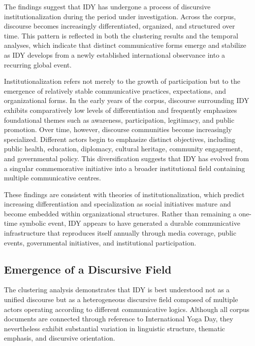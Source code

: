 \documentclass[11pt]{article}
\begin{document}
The findings suggest that IDY has undergone a process of discursive institutionalization during the period under
investigation. Across the corpus, discourse becomes increasingly differentiated, organized, and structured over time.
This pattern is reflected in both the clustering results and the temporal analyses, which indicate that distinct
communicative forms emerge and stabilize as IDY develops from a newly established international observance into a
recurring global event.


Institutionalization refers not merely to the growth of participation but to the emergence of relatively stable
communicative practices, expectations, and organizational forms. In the early years of the corpus, discourse surrounding
IDY exhibits comparatively low levels of differentiation and frequently emphasizes foundational themes such as
awareness, participation, legitimacy, and public promotion. Over time, however, discourse communities become
increasingly specialized. Different actors begin to emphasize distinct objectives, including public health, education,
diplomacy, cultural heritage, community engagement, and governmental policy. This diversification suggests that IDY has
evolved from a singular commemorative initiative into a broader institutional field containing multiple communicative
centres.


These findings are consistent with theories of institutionalization, which predict increasing differentiation and
specialization as social initiatives mature and become embedded within organizational structures. Rather than remaining
a one-time symbolic event, IDY appears to have generated a durable communicative infrastructure that reproduces itself
annually through media coverage, public events, governmental initiatives, and institutional participation.


\subsection{Emergence of a Discursive Field}



The clustering analysis demonstrates that IDY is best understood not as a unified discourse but as a heterogeneous
discursive field composed of multiple actors operating according to different communicative logics. Although all corpus
documents are connected through reference to International Yoga Day, they nevertheless exhibit substantial variation in
linguistic structure, thematic emphasis, and discursive orientation.
\end{document}
